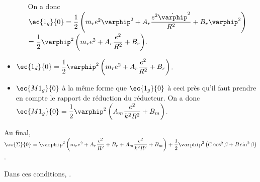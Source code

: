 \begin{corrige}
\begin{itemize}
\begin{itemize}
On a donc 
$\ec{1_g}{0}= \dfrac{1}{2} \left(m_re^2\varphip^2 + A_r \dfrac{e^2 \dot{\varphip}^2}{R^2} + B_r \varphip^2\right)$
$= \dfrac{1}{2} \varphip^2\left(m_re^2 + A_r \dfrac{e^2}{R^2} + B_r \right)$.
\end{itemize}
\item $\ec{1_d}{0}= \dfrac{1}{2} \varphip^2\left(m_re^2 + A_r \dfrac{e^2}{R^2} + B_r \right)$.

\item $\ec{M1_g}{0}$ à la même forme que $\ec{1_g}{0}$ à ceci près qu'il faut prendre en compte le rapport de réduction du réducteur. On a donc $\ec{M1_g}{0}= \dfrac{1}{2} \varphip^2\left( A_m \dfrac{e^2}{k^2 R^2} + B_m \right)$.
\end{itemize}

Au final, $\ec{\Sigma}{0} =  \varphip^2\left(m_re^2 + A_r \dfrac{e^2}{R^2} + B_r +  A_m \dfrac{e^2}{k^2 R^2} + B_m \right)+\dfrac{1}{2}\varphip^2 \left(C\cos^2\beta +B\sin^2\beta\right)$.

Dans ces conditions, .
\end{corrige}
\else
\fi



